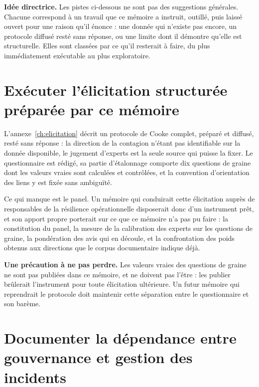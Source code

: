 \begin{cle}
\textbf{Idée directrice.} Les pistes ci-dessous ne sont pas des suggestions générales. Chacune
correspond à un travail que ce mémoire a instruit, outillé, puis laissé ouvert pour une raison
qu'il énonce : une donnée qui n'existe pas encore, un protocole diffusé resté sans réponse, ou une
limite dont il démontre qu'elle est structurelle. Elles sont classées par ce qu'il resterait à
faire, du plus immédiatement exécutable au plus exploratoire.
\end{cle}

\section{Exécuter l'élicitation structurée préparée par ce mémoire}

L'annexe~\ref{ch:elicitation} décrit un protocole de Cooke complet, préparé et diffusé, resté
sans réponse : la direction de la contagion n'étant pas identifiable sur la donnée disponible, le
jugement d'experts est la seule source qui puisse la fixer. Le questionnaire est rédigé, sa partie d'étalonnage
comporte dix questions de graine dont les valeurs vraies sont calculées et contrôlées, et la
convention d'orientation des liens y est fixée sans ambiguïté.

Ce qui manque est le panel. Un mémoire qui conduirait cette élicitation auprès de responsables de
la résilience opérationnelle disposerait donc d'un instrument prêt, et son apport propre porterait
sur ce que ce mémoire n'a pas pu faire : la constitution du panel, la mesure de la calibration des
experts sur les questions de graine, la pondération des avis qui en découle, et la confrontation
des poids obtenus aux directions que le corpus documentaire indique déjà.

\begin{attention}
\textbf{Une précaution à ne pas perdre.} Les valeurs vraies des questions de graine ne sont pas
publiées dans ce mémoire, et ne doivent pas l'être : les publier brûlerait l'instrument pour toute
élicitation ultérieure. Un futur mémoire qui reprendrait le protocole doit maintenir cette
séparation entre le questionnaire et son barème.
\end{attention}

\section{Documenter la dépendance entre gouvernance et gestion des incidents}


